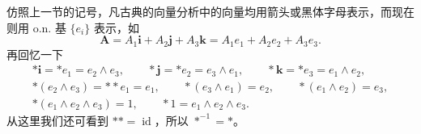 仿照上一节的记号，凡古典的向量分析中的向量均用箭头或黑体字母表示，而现在则用 o.n. 基 $\{e_i\}$ 表示，如
\[
 \mathbf A=A_1\mathbf i+A_2\mathbf j+A_3\mathbf k=A_1e_1+A_2e_2+A_3e_3.
\]
再回忆一下
\begin{equation}
\begin{gathered}
 *\mathbf i=*e_1=e_2\wedge e_3,\qquad *\mathbf j=*e_2=e_3\wedge e_1,\qquad *\mathbf k=*e_3=e_1\wedge e_2,\\
 *(e_2\wedge e_3)=**e_1=e_1,\qquad *(e_3\wedge e_1)=e_2,\qquad *(e_1\wedge e_2)=e_3,\\
 *(e_1\wedge e_2\wedge e_3)=1,\qquad *1=e_1\wedge e_2\wedge e_3.
\end{gathered}
 \tag{27}
\end{equation}
从这里我们还可看到 $**=\operatorname{id}$，所以 $*^{-1}=*$。

